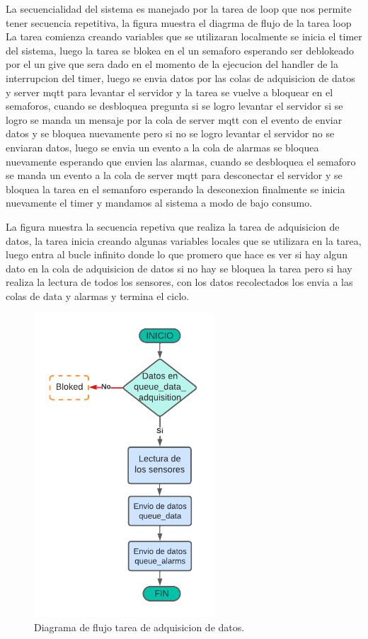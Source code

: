 La secuencialidad del sistema es manejado por la tarea de loop que nos permite tener secuencia repetitiva, la figura muestra el diagrma de flujo de la tarea loop 
La tarea comienza creando variables que se utilizaran localmente se inicia el timer del sistema, luego la tarea se blokea en el un semaforo esperando ser deblokeado por el un give que sera dado en el momento de la ejecucion del handler de la interrupcion del timer, luego se envia datos por las colas de adquisicion de datos y server mqtt para levantar el servidor y la tarea se vuelve a bloquear en el semaforos, cuando se desbloquea pregunta si se logro levantar el servidor si se logro se manda un mensaje por la cola de server mqtt con el evento de enviar datos y se bloquea nuevamente pero si no se logro levantar el servidor no se enviaran datos, luego se envia un evento a la cola de alarmas se bloquea nuevamente esperando que envien las alarmas, cuando se desbloquea el semaforo se manda un evento a la cola de server mqtt para desconectar el servidor y se bloquea la tarea en el semanforo esperando la desconexion  finalmente se inicia nuevamente el timer y mandamos al sistema a modo de bajo consumo. 


La figura muestra la secuencia repetiva que realiza la tarea de adquisicion de datos, la tarea inicia creando algunas variables locales que se utilizara en la tarea, luego entra al bucle infinito donde lo que promero que hace es ver si hay algun dato en la cola de adquisicion de datos si no hay se bloquea la tarea pero si hay realiza la lectura de todos los sensores, con los datos recolectados los envia a las colas de data y alarmas y termina el ciclo.
\begin{figure}[htbp]
  \centering
	\includegraphics[width=0.6\textwidth]{./Figures/DF task adquisicion.png}
	\caption{Diagrama de flujo tarea de adquisicion de datos.}
	\label{fig:Df tarea adquisicion}
\end{figure}

